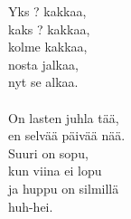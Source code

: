 
Yks ? kakkaa, \\ kaks ? kakkaa, \\ kolme kakkaa, \\ nosta jalkaa, \\ nyt se alkaa. \\ \hspace{10mm} \\ On lasten juhla tää, \\ en selvää päivää nää. \\ Suuri on sopu, \\ kun viina ei lopu \\ ja huppu on silmillä \\ huh-hei.